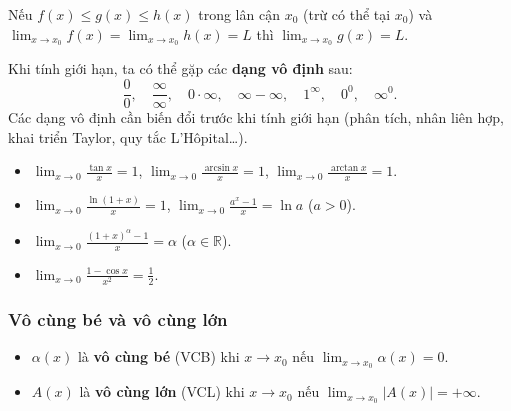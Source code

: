 \documentclass[12pt,a4paper]{article}
\begin{document}
\begin{dinhly}[title={Định lý kẹp (Squeeze theorem)}]
  Nếu $f(x) \le g(x) \le h(x)$ trong lân cận $x_0$ (trừ có thể tại $x_0$) và $\displaystyle\lim_{x \to x_0} f(x) = \lim_{x \to x_0} h(x) = L$ thì $\displaystyle\lim_{x \to x_0} g(x) = L$.
\end{dinhly}

\begin{dinhnghia}[title={Các dạng vô định}]
  Khi tính giới hạn, ta có thể gặp các \textbf{dạng vô định} sau:
  \[
    \frac{0}{0}, \quad \frac{\infty}{\infty}, \quad 0 \cdot \infty, \quad \infty - \infty, \quad 1^\infty, \quad 0^0, \quad \infty^0.
  \]
  Các dạng vô định cần biến đổi trước khi tính giới hạn (phân tích, nhân liên hợp, khai triển Taylor, quy tắc L'Hôpital\ldots).
\end{dinhnghia}

\begin{congthuc}[title={Giới hạn quan trọng mở rộng}]
  \begin{itemize}
    \item $\displaystyle\lim_{x \to 0} \frac{\tan x}{x} = 1$, \quad $\displaystyle\lim_{x \to 0} \frac{\arcsin x}{x} = 1$, \quad $\displaystyle\lim_{x \to 0} \frac{\arctan x}{x} = 1$.
    \item $\displaystyle\lim_{x \to 0} \frac{\ln(1+x)}{x} = 1$, \quad $\displaystyle\lim_{x \to 0} \frac{a^x - 1}{x} = \ln a$ ($a > 0$).
    \item $\displaystyle\lim_{x \to 0} \frac{(1+x)^\alpha - 1}{x} = \alpha$ ($\alpha \in \mathbb{R}$).
    \item $\displaystyle\lim_{x \to 0} \frac{1 - \cos x}{x^2} = \frac{1}{2}$.
  \end{itemize}
\end{congthuc}

\subsubsection{Vô cùng bé và vô cùng lớn}

\begin{dinhnghia}
  \begin{itemize}
    \item $\alpha(x)$ là \textbf{vô cùng bé} (VCB) khi $x \to x_0$ nếu $\displaystyle\lim_{x \to x_0} \alpha(x) = 0$.
    \item $A(x)$ là \textbf{vô cùng lớn} (VCL) khi $x \to x_0$ nếu $\displaystyle\lim_{x \to x_0} |A(x)| = +\infty$.
  \end{itemize}
\end{dinhnghia}
\end{document}
